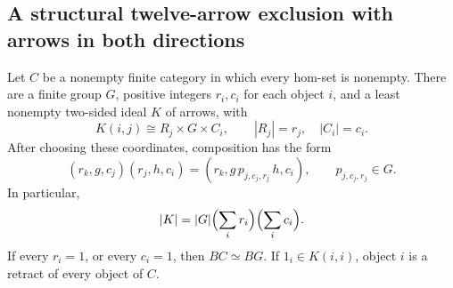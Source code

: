 \subsection{A structural twelve-arrow exclusion with arrows in both directions}

\begin{lemma}
\label{C:finite-category-Rees}
Let $C$ be a nonempty finite category in which every hom-set is
nonempty. There are a finite group $G$, positive integers $r_i,c_i$
for each object $i$, and a least nonempty two-sided ideal $K$ of
arrows, with
\[
 K(i,j)\cong R_j\times G\times C_i,
 \qquad |R_j|=r_j,\quad |C_i|=c_i.
\]
After choosing these coordinates, composition has the form
\[
 (r_k,g,c_j)(r_j,h,c_i)
       =(r_k,g\,p_{j,c_j,r_j}\,h,c_i),\qquad p_{j,c_j,r_j}\in G.
\]
In particular,
\[
 |K|=|G|\Bigl(\sum_i r_i\Bigr)\Bigl(\sum_i c_i\Bigr).
\]
If every $r_i=1$, or every $c_i=1$, then $BC\simeq BG$.
If $1_i\in K(i,i)$, object $i$ is a retract of every object of $C$.
\end{lemma}
